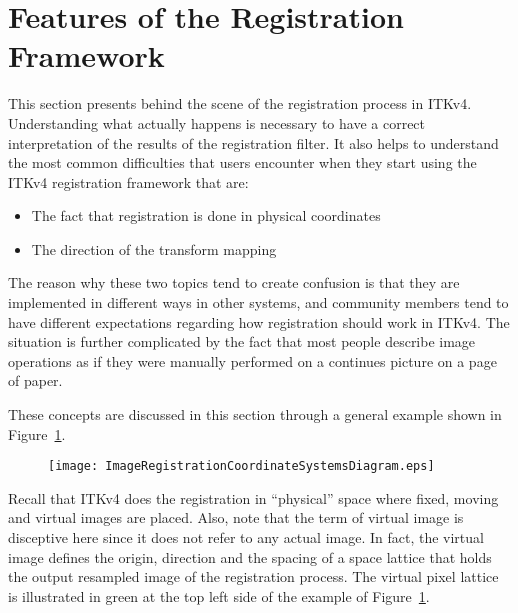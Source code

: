 \section{Features of the Registration Framework}
\label{sec:FeaturesOfTheRegistrationFramework}

This section presents behind the scene of the registration process in ITKv4.
Understanding what actually happens is necessary to have a correct interpretation
of the results of the registration filter. It also helps to understand the
most common difficulties that users encounter when they start using the ITKv4
registration framework that are:

\begin{itemize}
\item The fact that registration is done in physical coordinates
\item The direction of the transform mapping
\end{itemize}

The reason why these two topics tend to create confusion is that they
are implemented in different ways in other systems, and community members tend to
have different expectations regarding how registration should work in ITKv4. The
situation is further complicated by the fact that most people describe image
operations as if they were manually performed on a continues picture on a page
of paper.

These concepts are discussed in this section through a general example shown in
Figure~\ref{fig:ImageRegistrationCoordinateSystemsDiagram}.

\begin{figure}
\center
\texttt{[image: ImageRegistrationCoordinateSystemsDiagram.eps]}
\label{fig:ImageRegistrationCoordinateSystemsDiagram}
\end{figure}

Recall that ITKv4 does the registration in ``physical'' space where fixed,
moving and virtual images are placed. Also, note that the term of
virtual image is disceptive here since it does not refer to any actual
image. In fact, the virtual image defines the origin, direction and the
spacing of a space lattice that holds the output resampled image of the
registration process. The virtual pixel lattice is illustrated in green
at the top left side of the example of
Figure~\ref{fig:ImageRegistrationCoordinateSystemsDiagram}.

